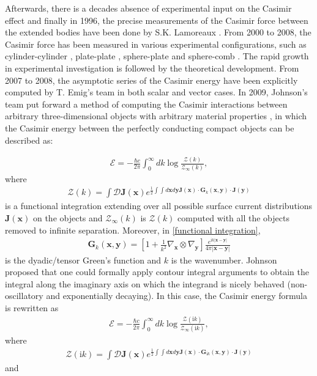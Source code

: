 Afterwards, there is a decades absence of experimental input on the Casimir effect and finally in 1996, the precise measurements of the Casimir force between 
the extended bodies have been done by S.K. Lamoreaux \cite{lamoreaux1997demonstration}. From 2000 to 2008, the Casimir force has been measured in various 
experimental configurations, such as cylinder-cylinder \cite{ederth2000template}, plate-plate \cite{bressi2002measurement}, 
sphere-plate \cite{krause2007experimental} and sphere-comb \cite{chan2008measurement}. The rapid growth in experimental investigation is followed by the 
theoretical development. From 2007 to 2008, the asymptotic series of the Casimir energy have been explicitly computed by T. Emig's team in both scalar
\cite{emig2008casimir} and vector \cite{emig2007casimir} cases. In 2009, Johnson's team put forward a method of computing the Casimir interactions between 
arbitrary three-dimensional objects with arbitrary material properties \cite{reid2009efficient}, in which the Casimir energy between the perfectly
conducting compact objects can be described as:

\begin{align*}
    \mathcal{E} = -\frac{\hbar c}{2\pi}\int_{0}^{\infty}dk\log\frac{\mathcal{Z}(k)}{\mathcal{Z}_{\infty}(k)},
\end{align*}
where 
\begin{align}\label{functional integration}
    \mathcal{Z}(k) = \int \mathcal{D}\boldsymbol{J}(\boldsymbol{x})e^{\frac{1}{2}\int\int d\boldsymbol{x}d\boldsymbol{y}\boldsymbol{J}(\boldsymbol{x}) \cdot \boldsymbol{G}_{k}(\boldsymbol{x}, \boldsymbol{y}) \cdot \boldsymbol{J}(\boldsymbol{y})}
\end{align}
is a functional integration extending over all possible surface current distributions $\boldsymbol{J}(\boldsymbol{x})$ on the objects and 
$\mathcal{Z}_{\infty}(k)$ is $\mathcal{Z}(k)$ computed with all the objects removed to infinite separation. Moreover, in \eqref{functional integration},
\begin{align*}
    \boldsymbol{G}_{k}(\boldsymbol{x}, \boldsymbol{y}) = \left[1 + \frac{1}{k^{2}}\nabla_{\boldsymbol{x}}\otimes\nabla_{\boldsymbol{y}}\right]\frac{e^{\mathrm{i}k|\boldsymbol{x} - \boldsymbol{y}|}}{4\pi|\boldsymbol{x} - \boldsymbol{y}|}
\end{align*}
is the dyadic/tensor Green's function and $k$ is the wavenumber. Johnson proposed that one could formally apply contour integral arguments to obtain the integral 
along the imaginary axis on which the integrand is nicely behaved (non-oscillatory and exponentially decaying). In this case, the Casimir energy formula 
is rewritten as 
\begin{align}\label{rotated CasE}
    \mathcal{E} = -\frac{\hbar c}{2\pi}\int_{0}^{\infty}dk\log\frac{\mathcal{Z}(\mathrm{i}k)}{\mathcal{Z}_{\infty}(\mathrm{i}k)},
\end{align}
where 
\begin{align}
    \mathcal{Z}(\mathrm{i}k) = \int \mathcal{D}\boldsymbol{J}(\boldsymbol{x})e^{\frac{1}{2}\int\int d\boldsymbol{x}d\boldsymbol{y}\boldsymbol{J}(\boldsymbol{x}) \cdot \boldsymbol{G}_{\mathrm{i}k}(\boldsymbol{x}, \boldsymbol{y}) \cdot \boldsymbol{J}(\boldsymbol{y})}
\end{align}
and 

